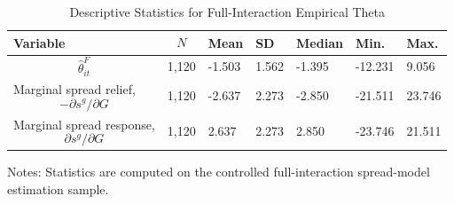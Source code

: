 \begin{table}[H]\centering
\begin{threeparttable}
\caption{Descriptive Statistics for Full-Interaction Empirical Theta}
\label{tab:theta_descriptive_stats}
\scriptsize
\begin{tabularx}{\textwidth}{lYYYYYY}
\toprule
Variable & $$N$$ & Mean & SD & Median & Min. & Max. \\
\midrule
$$\widehat{\theta}^{F}_{it}$$ & 1,120 & -1.503 & 1.562 & -1.395 & -12.231 & 9.056 \\
Marginal spread relief, $$-\partial s^g/\partial G$$ & 1,120 & -2.637 & 2.273 & -2.850 & -21.511 & 23.746 \\
Marginal spread response, $$\partial s^g/\partial G$$ & 1,120 & 2.637 & 2.273 & 2.850 & -23.746 & 21.511 \\
\bottomrule
\end{tabularx}
\begin{tablenotes}[flushleft]\footnotesize
\item Notes: Statistics are computed on the controlled full-interaction spread-model estimation sample.
\end{tablenotes}
\end{threeparttable}
\end{table}
